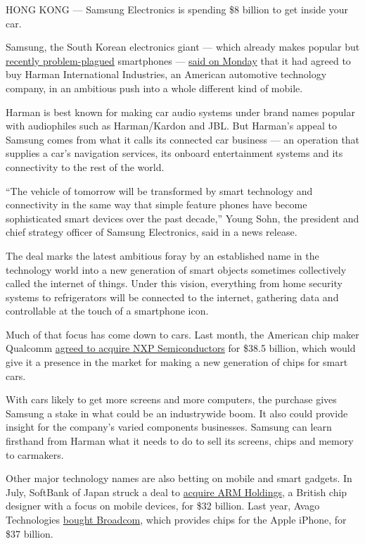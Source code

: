 HONG KONG --- Samsung Electronics is spending \$8 billion to get inside
your car.

Samsung, the South Korean electronics giant --- which already makes
popular but
\href{http://www.nytimes.com/2016/10/12/business/international/samsung-galaxy-note7-terminated.html}{recently
problem-plagued} smartphones ---
\href{https://news.samsung.com/global/samsung-electronics-to-acquire-harman-accelerating-growth-in-automotive-and-connected-technologies}{said
on Monday} that it had agreed to buy Harman International Industries, an
American automotive technology company, in an ambitious push into a
whole different kind of mobile.

Harman is best known for making car audio systems under brand names
popular with audiophiles such as Harman/Kardon and JBL. But Harman's
appeal to Samsung comes from what it calls its connected car business
--- an operation that supplies a car's navigation services, its onboard
entertainment systems and its connectivity to the rest of the world.

``The vehicle of tomorrow will be transformed by smart technology and
connectivity in the same way that simple feature phones have become
sophisticated smart devices over the past decade,'' Young Sohn, the
president and chief strategy officer of Samsung Electronics, said in a
news release.

The deal marks the latest ambitious foray by an established name in the
technology world into a new generation of smart objects sometimes
collectively called the internet of things. Under this vision,
everything from home security systems to refrigerators will be connected
to the internet, gathering data and controllable at the touch of a
smartphone icon.

Much of that focus has come down to cars. Last month, the American chip
maker Qualcomm
\href{http://www.nytimes.com/2016/10/28/business/dealbook/qualcomm-acquire-nxp-semiconductors.html}{agreed
to acquire NXP Semiconductors} for \$38.5 billion, which would give it a
presence in the market for making a new generation of chips for smart
cars.

With cars likely to get more screens and more computers, the purchase
gives Samsung a stake in what could be an industrywide boom. It also
could provide insight for the company's varied components businesses.
Samsung can learn firsthand from Harman what it needs to do to sell its
screens, chips and memory to carmakers.

Other major technology names are also betting on mobile and smart
gadgets. In July, SoftBank of Japan struck a deal to
\href{http://www.nytimes.com/2016/07/19/business/dealbook/softbank-buys-chip-designer-arm.html}{acquire
ARM Holdings}, a British chip designer with a focus on mobile devices,
for \$32 billion. Last year, Avago Technologies
\href{http://www.nytimes.com/2015/05/29/business/dealbook/avago-agrees-to-acquire-broadcom-for-37-billion.html}{bought
Broadcom}, which provides chips for the Apple iPhone, for \$37 billion.

